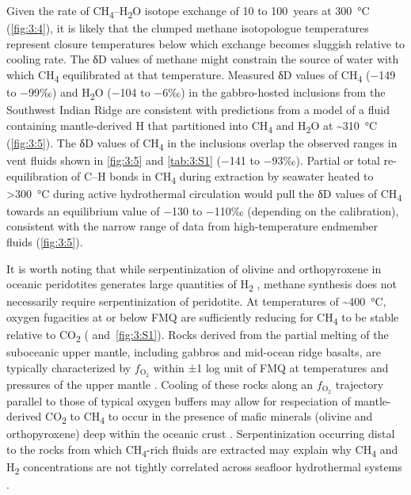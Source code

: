  \addtocounter{footnote}{-2} 	%

Given the rate of CH\textsubscript{4}--H\textsubscript{2}O isotope
exchange of 10 to 100~years at 300~°C (\autoref{fig:3:4}), it is likely that the
clumped methane isotopologue temperatures represent closure
temperatures below which exchange becomes sluggish relative to cooling
rate. The δD values of methane might constrain the source of water with
which CH\textsubscript{4} equilibrated at that temperature. Measured δD values of
CH\textsubscript{4} ($-$149 to $-$99‰) and H\textsubscript{2}O ($-$104 to $-$6‰)
in the gabbro-hosted inclusions from the Southwest Indian Ridge \parencite{Kelley+FruhGreen_1999_JGR} are consistent with predictions from a model of a
fluid containing mantle-derived H that partitioned into
CH\textsubscript{4} and H\textsubscript{2}O at \textasciitilde{}310~°C
(\autoref{fig:3:5}). The δD values of CH\textsubscript{4} in the inclusions overlap
the observed ranges in vent fluids shown in \autoref{fig:3:5} and \autoref{tab:3:S1} ($-$141 to $-$93‰). Partial or total re-equilibration of C--H bonds
in CH\textsubscript{4} during extraction by seawater heated to
\textgreater{}300~°C during active hydrothermal circulation would pull
the δD values of CH\textsubscript{4} towards an equilibrium value of
$-$130 to $-$110‰ (depending on the calibration), consistent with the narrow
range of data from high-temperature endmember fluids (\autoref{fig:3:5}).

It is worth noting that while serpentinization of olivine and
orthopyroxene in oceanic peridotites generates large quantities of
H\textsubscript{2} \parencite{Klein++_2009_GCA,McCollom+Bach_2009_GCA,Klein++_2013_L}, methane synthesis does not necessarily require
serpentinization of peridotite. At temperatures of
\textasciitilde{}400~°C, oxygen fugacities at or below FMQ are
sufficiently reducing for CH\textsubscript{4} to be stable relative to
CO\textsubscript{2} ( and~\ref{fig:3:S1}). Rocks derived
from the partial melting of the suboceanic upper mantle, including
gabbros and mid-ocean ridge basalts, are typically characterized by
\(f_{\mathrm{O}_{\mathrm{2}}}\) within ±1 log unit of FMQ at
temperatures and pressures of the upper mantle \parencite{Bryndzia+Wood_1990_AJS,Cottrell+Kelley_2011_EPSL}. Cooling of these rocks along an
\(f_{\mathrm{O}_{\mathrm{2}}}\) trajectory parallel to those of typical
oxygen buffers may allow for respeciation of mantle-derived
CO\textsubscript{2} to CH\textsubscript{4} to occur in the presence of
mafic minerals (olivine and orthopyroxene) deep within the oceanic crust
\parencite{Mathez++_1989_JPetrol,Kelley+FruhGreen_1999_JGR}. Serpentinization
occurring distal to the rocks from which CH\textsubscript{4}-rich fluids
are extracted may explain why CH\textsubscript{4} and H\textsubscript{2}
concentrations are not tightly correlated across seafloor hydrothermal
systems \parencite{Keir_2010_GRL,Kawagucci++_2013_CG}.

